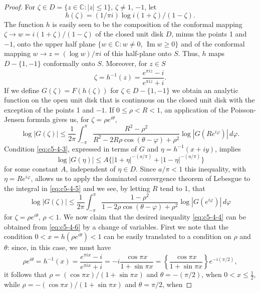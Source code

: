 \begin{proof}
For $\zeta \in D = \{z \in \mathbb{C} : |z| \leq 1\}$, $\zeta \neq 1$, $-1$,
let
\[
h(\zeta)=(1/\pi i)\log i(1+\zeta)/(1-\zeta).
\]
The function $h$ is easily seen to be the composition of the conformal mapping
$\zeta \to w = i(1 + \zeta)/(1 - \zeta)$ of the closed unit disk $D$, minus the
points 1 and $-1$, onto the upper half plane
$\{w \in \mathbb{C} : w \neq 0$, $\operatorname{Im} w \geq 0\}$ and of the
conformal mapping $w \to z = (\log w)/\pi i$ of this half-plane onto $S$.
Thus, $h$ maps $D - \{1, -1\}$ conformally onto $S$. Moreover, for $z \in S$
\[
\zeta=h^{-1}(z)=\frac{e^{\pi iz}-i}{e^{\pi iz}+i}.
\]
If we define $G(\zeta) = F(h(\zeta))$ for $\zeta \in D - \{1, -1\}$ we obtain
an analytic function on the open unit disk that is continuous on the closed
unit disk with the exception of the points 1 and $-1$. If $0 \leq \rho < R < 1$,
an application of the Poisson-Jensen formula gives us, for
$\zeta = \rho e^{i\theta}$,
\begin{equation}\label{eq:c5-4-5}
\log|G(\zeta)|\leq\frac{1}{2\pi}\int_{-\pi}^{\pi}
\frac{R^{2}-\rho^{2}}{R^{2}-2R\rho\cos(\theta-\varphi)+\rho^{2}}
\log|G(Re^{i\varphi})|\,d\varphi.
\end{equation}
Condition \eqref{eq:c5-4-3}, expressed in terms of $G$ and
$\eta = h^{-1}(x + iy)$, implies
\[
\log|G(\eta)|\leq A\{|1+\eta|^{-(a/\pi)}+|1-\eta|^{-(a/\pi)}\}
\]
for some constant $A$, independent of $\eta \in D$. Since $a/\pi < 1$ this
inequality, with $\eta = Re^{i\varphi}$, allows us to apply the dominated
convergence theorem of Lebesgue to the integral in \eqref{eq:c5-4-5} and we
see, by letting $R$ tend to 1, that
\begin{equation}\label{eq:c5-4-6}
\log|G(\zeta)|\leq\frac{1}{2\pi}\int_{-\pi}^{\pi}
\frac{1-\rho^{2}}{1-2\rho\cos(\theta-\varphi)+\rho^{2}}
\log|G(e^{i\varphi})|\,d\varphi
\end{equation}
for $\zeta = \rho e^{i\theta}$, $\rho < 1$. We now claim that the desired
inequality \eqref{eq:c5-4-4} can be obtained from \eqref{eq:c5-4-6} by a change
of variables. First we note that the condition
$0 < x = h(\rho e^{i\theta}) < 1$ can be easily translated to a condition on
$\rho$ and $\theta$: since, in this case, we must have
\[
\rho e^{i\theta}=h^{-1}(x)=\frac{e^{\pi ix}-i}{e^{\pi ix}+i}
=-i\frac{\cos\pi x}{1+\sin\pi x}
=\left\{\frac{\cos\pi x}{1+\sin\pi x}\right\}e^{-i(\pi/2)},
\]
it follows that $\rho = (\cos\pi x)/(1 + \sin\pi x)$ and $\theta = -(\pi/2)$,
when $0 < x \leq \frac{1}{2}$, while
$\rho = -(\cos\pi x)/(1 + \sin\pi x)$ and $\theta = \pi/2$, when

\end{proof}
